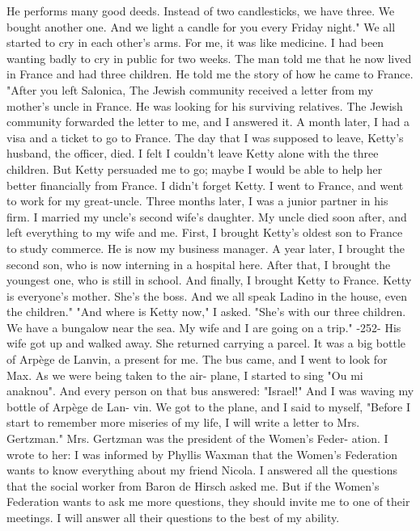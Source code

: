 He performs 
many good deeds.
Instead of two candlesticks, we have three.
We 
bought another one.
And we light a candle for you every Friday night."
We all started to cry in each other's arms.
For me, it was like 
medicine.
I had been wanting badly to cry in public for two 
weeks.
The man told me that he now lived in France and had three children.
He told me the story of how he came to France.
"After you left Salonica, The Jewish community received a letter 
from my mother's uncle in France.
He was looking for his surviving 
relatives.
The Jewish community forwarded the letter to me, and I 
answered it.
A month later, I had a visa and a ticket to go to France.
The day that I was supposed to leave, Ketty's husband, the officer, 
died.
I felt I couldn't leave Ketty alone with the three children.
But Ketty persuaded me to go; maybe I would be able to help her better 
financially from France.
I didn't forget Ketty.
I went to France, and went to work for 
my great-uncle.
Three months later, I was a junior partner in his 
firm.
I married my uncle's second wife's daughter.
My uncle died 
soon after, and left everything to my wife and me.
First, I brought 
Ketty's oldest son to France to study commerce.
He is now my business 
manager.
A year later, I brought the second son, who is now interning 
in a hospital here.
After that, I brought the youngest one, who is 
still in school.
And finally, I brought Ketty to France.
Ketty is 
everyone's mother.
She's the boss.
And we all speak Ladino in the 
house, even the children."
"And where is Ketty now," I asked.
"She's with our three children.
We have a bungalow near the sea.
My wife and I are going on a trip."
-252-
His wife got up and walked away.
She returned carrying a parcel.
It was a big bottle of Arpège de Lanvin, a present for me.
The bus 
came, and I went to look for Max.
As we were being taken to the air-
plane, I started to sing "Ou mi anaknou".
And every person on that 
bus answered: "Israel!"
And I was waving my bottle of Arpège de Lan-
vin.
We got to the plane, and I said to myself, "Before I start to 
remember more miseries of my life, I will write a letter to 
Mrs.
Gertzman."
Mrs.
Gertzman was the president of the Women's Feder-
ation.
I wrote to her: 
I was informed by Phyllis Waxman that the Women's 
Federation wants to know everything about my friend Nicola.
I answered all the questions that the social 
worker from Baron de Hirsch asked me.
But if the Women's Federation wants to ask me more questions, they 
should invite me to one of their meetings.
I will answer all their questions to the best of my ability.
